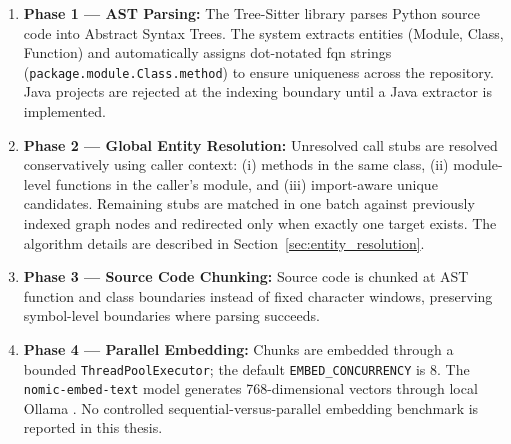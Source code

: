 \documentclass[12pt,letterpaper,oneside]{report}
\begin{document}
\begin{enumerate}
    \item \textbf{Phase 1 --- AST Parsing:} The Tree-Sitter library \cite{treesitter} parses Python source code into Abstract Syntax Trees. The system extracts entities (Module, Class, Function) and automatically assigns dot-notated \gls{fqn} strings (\texttt{package.module.Class.method}) to ensure uniqueness across the repository. Java projects are rejected at the indexing boundary until a Java extractor is implemented.
    \item \textbf{Phase 2 --- Global Entity Resolution:} Unresolved call stubs are resolved conservatively using caller context: (i) methods in the same class, (ii) module-level functions in the caller's module, and (iii) import-aware unique candidates. Remaining stubs are matched in one batch against previously indexed graph nodes and redirected only when exactly one target exists. The algorithm details are described in Section~\ref{sec:entity_resolution}.
    \item \textbf{Phase 3 --- Source Code Chunking:} Source code is chunked at AST function and class boundaries instead of fixed character windows, preserving symbol-level boundaries where parsing succeeds.
    \item \textbf{Phase 4 --- Parallel Embedding:} Chunks are embedded through a bounded \texttt{ThreadPool\allowbreak Executor}; the default \texttt{EMBED\_\allowbreak CONCURRENCY} is 8. The \texttt{nomic-embed-text} model \cite{nussbaum2024nomic} generates 768-dimensional vectors through local Ollama \cite{ollama2024}. No controlled sequential-versus-parallel embedding benchmark is reported in this thesis.
\end{enumerate}
\end{document}
